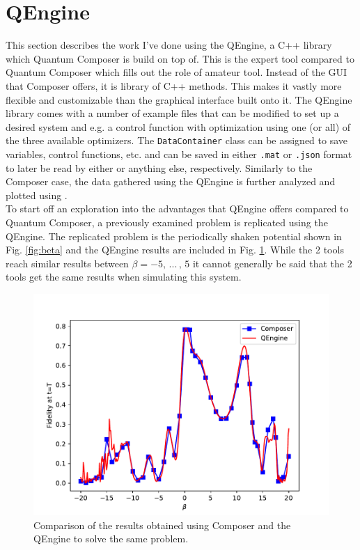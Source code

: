 \documentclass[a4paper, twocolumn]{revtex4-1}
\begin{document}
\section{QEngine}\label{sec:QEngine}
This section describes the work I've done using the QEngine, a C++ library which Quantum Composer is build on top of. This is the expert tool compared to Quantum Composer which fills out the role of amateur tool. Instead of the GUI that Composer offers, it is library of C++ methods. This makes it vastly more flexible and customizable than the graphical interface built onto it. The QEngine library comes with a number of example files that can be modified to set up a desired system and e.g. a control function with optimization using one (or all) of the three available optimizers. The \texttt{DataContainer} class can be assigned to save variables, control functions, etc. and can be saved in either \texttt{.mat} or \texttt{.json} format to later be read by either  or anything else, respectively. Similarly to the Composer case, the data gathered using the QEngine is further analyzed and plotted using . \\

To start off an exploration into the advantages that QEngine offers compared to Quantum Composer, a previously examined problem is replicated using the QEngine. The replicated problem is the periodically shaken potential shown in Fig. \ref{fig:beta} and the QEngine results are included in Fig. \ref{fig:QEngine_nonOPt}. While the 2 tools reach similar results between $\beta = -5, \, ...\, , \, 5$ it cannot generally be said that the 2 tools get the same results when simulating this system.
\begin{figure}
	\includegraphics[width=\columnwidth]{graphics/qengine/comparison.pdf}
	\caption{Comparison of the results obtained using Composer and the QEngine to solve the same problem.}
	\label{fig:QEngine_nonOPt}
\end{figure}
\end{document}
